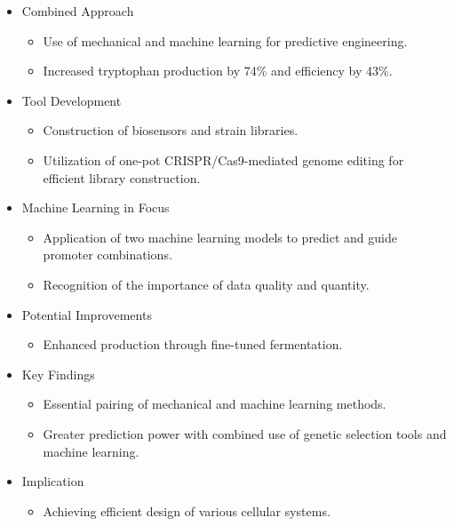 \documentclass{beamer}
\begin{document}
\begin{frame}{}

    \begin{itemize} [<+-| alert@+>] %
        \item Combined Approach
            \begin{itemize} [<+-| alert@+>] %
            \item\scriptsize Use of mechanical and machine learning for predictive engineering.
            \item\scriptsize Increased tryptophan production by 74\% and efficiency by 43\%. 
            \end{itemize}
        \item Tool Development 
            \begin{itemize} [<+-| alert@+>] %
            \item\scriptsize Construction of biosensors and strain libraries.
            \item\scriptsize Utilization of one-pot CRISPR/Cas9-mediated genome editing for efficient library construction. 
            \end{itemize}
        \item Machine Learning in Focus
            \begin{itemize} [<+-| alert@+>] %
            \item\scriptsize Application of two machine learning models to predict and guide promoter combinations.
            \item\scriptsize Recognition of the importance of data quality and quantity. 
            \end{itemize}
        \item Potential Improvements
            \begin{itemize} [<+-| alert@+>] %
            \item\scriptsize Enhanced production through fine-tuned fermentation.
            \end{itemize}
        \item Key Findings
            \begin{itemize} [<+-| alert@+>] %
            \item\scriptsize Essential pairing of mechanical and machine learning methods.
            \item\scriptsize Greater prediction power with combined use of genetic selection tools and machine learning. 
            \end{itemize}
        \item Implication
            \begin{itemize} [<+-| alert@+>] %
            \item\scriptsize Achieving efficient design of various cellular systems.
            \end{itemize}
    \end{itemize}


\end{frame}
\end{document}
